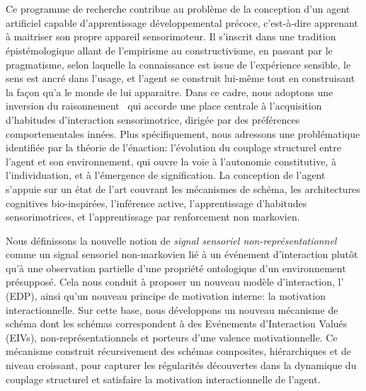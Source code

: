 \chapter*{}
\vspace{-4cm}
    \begin{minipage}[r]{.95\textwidth}\raggedleft
    \HUGE\bfseries\AbstractName
    \end{minipage}
\vspace{2cm}


\noindent
Ce programme de recherche contribue au problème de la conception d'un agent artificiel capable d'apprentissage développemental précoce, c'est-à-dire apprenant à maitriser son propre appareil sensorimoteur.
Il s'inscrit dans une tradition épistémologique allant de l'empirisme au constructivisme, en passant par le pragmatisme, selon laquelle la connaissance est issue de l'expérience sensible, le sens est ancré dans l'usage, et l'agent se construit lui-même tout en construisant la façon qu'a le monde de lui apparaitre. 
Dans ce cadre, nous adoptons une \og inversion du raisonnement \fg\ qui accorde une place centrale à l'acquisition d'habitudes d'interaction sensorimotrice, dirigée par des préférences comportementales innées. 
Plus spécifiquement, nous adressons une problématique identifiée par la théorie de l'énaction: l'évolution du couplage structurel entre l'agent et son environnement, qui ouvre la voie à l'autonomie constitutive, à l'individuation, et à l'émergence de signification.
La conception de l'agent s'appuie sur un état de l'art couvrant les mécanismes de schéma, les architectures cognitives bio-inspirées, l'inférence active, l'apprentissage d'habitudes sensorimotrices, et l'apprentissage par renforcement non markovien. 

Nous définissons la nouvelle notion de \emph{signal sensoriel non-représentationnel} comme un signal sensoriel non-markovien lié à un événement d'interaction plutôt qu'à une observation partielle d'une propriété ontologique d'un environnement présupposé. 
Cela nous conduit à proposer un nouveau modèle d'interaction, l' (EDP), ainsi qu'un nouveau principe de motivation interne: la motivation interactionnelle.
Sur cette base, nous développons un nouveau mécanisme de schéma dont les schémas correspondent à des Evénements d'Interaction Valués (EIVs), non-représentationnels et porteurs d'une valence motivationnelle. 
Ce mécanisme construit récursivement des schémas composites, hiérarchiques et de niveau croissant, pour capturer les régularités découvertes dans la dynamique du couplage structurel et satisfaire la motivation interactionnelle de l'agent.   

